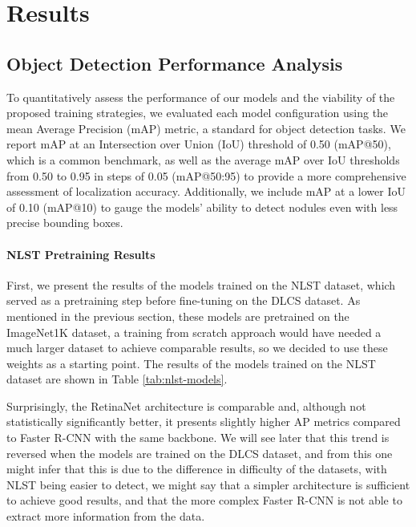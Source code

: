 \chapter{Results}
\label{chap:results}
\section{Object Detection Performance Analysis}

To quantitatively assess the performance of our models and the viability of the proposed training strategies, we evaluated each model configuration using the mean Average Precision (mAP) metric, a standard for object detection tasks. We report mAP at an Intersection over Union (IoU) threshold of 0.50 (mAP@50), which is a common benchmark, as well as the average mAP over IoU thresholds from 0.50 to 0.95 in steps of 0.05 (mAP@50:95) to provide a more comprehensive assessment of localization accuracy. Additionally, we include mAP at a lower IoU of 0.10 (mAP@10) to gauge the models' ability to detect nodules even with less precise bounding boxes.

\subsubsection{NLST Pretraining Results}
First, we present the results of the models trained on the NLST dataset, which served as a pretraining step before fine-tuning on the DLCS dataset.
As mentioned in the previous section, these models are pretrained on the ImageNet1K dataset, a training from scratch approach would have needed a much larger dataset to achieve comparable results, so we decided to use these weights as a starting point.
The results of the models trained on the NLST dataset are shown in Table \ref{tab:nlst-models}.



Surprisingly, the RetinaNet architecture is comparable and, although not statistically significantly better, it presents slightly higher AP metrics compared to Faster R-CNN with the same backbone.
We will see later that this trend is reversed when the models are trained on the DLCS dataset, and from this one might infer that this is due to the difference in difficulty of the datasets, with NLST being easier to detect, we might say that a simpler architecture is sufficient to achieve good results, and that the more complex Faster R-CNN is not able to extract more information from the data.

